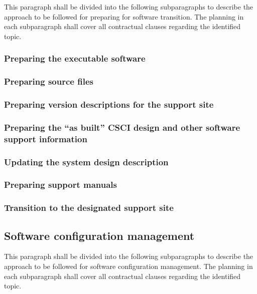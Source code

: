 \documentclass{fidata-report-template}
\begin{document}
This paragraph shall be divided into the following subparagraphs to
describe the approach to be followed for preparing for software
transition. The planning in each subparagraph shall cover all
contractual clauses regarding the identified topic.

\subsubsection{Preparing the executable software}

\subsubsection{Preparing source files}

\subsubsection{Preparing version descriptions for the support site}

\subsubsection{Preparing the ``as built'' CSCI design and other
software support information}

\subsubsection{Updating the system design description}

\subsubsection{Preparing support manuals}

\subsubsection{Transition to the designated support site}

\subsection{Software configuration management}

This paragraph shall be divided into the following subparagraphs to
describe the approach to be followed for software configuration
management. The planning in each subparagraph shall cover all
contractual clauses regarding the identified topic.
\end{document}
